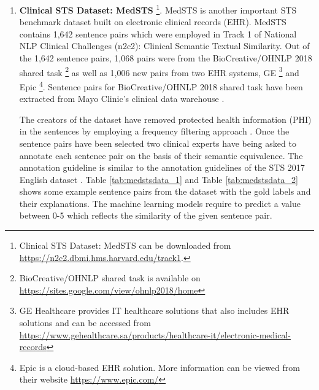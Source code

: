\begin{enumerate}
	 
	\item{ \textbf{Clinical STS Dataset: MedSTS} \footnote{Clinical STS Dataset: MedSTS can be downloaded from \url{https://n2c2.dbmi.hms.harvard.edu/track1}. }}. MedSTS is another important STS benchmark dataset built on electronic clinical records (EHR). MedSTS contains 1,642 sentence pairs which were employed in Track 1 of National NLP Clinical Challenges (n2c2): Clinical Semantic Textual Similarity. Out of the 1,642 sentence pairs, 1,068 pairs were from the BioCreative/OHNLP 2018 shared task \cite{10.1145/3233547.3233672} \footnote{BioCreative/OHNLP shared task is available on \url{https://sites.google.com/view/ohnlp2018/home}} as well as 1,006 new pairs from two EHR systems, GE \footnote{GE Healthcare provides IT healthcare solutions that also includes EHR solutions and can be accessed from \url{https://www.gehealthcare.sa/products/healthcare-it/electronic-medical-records}} and Epic \footnote{Epic is a cloud-based EHR solution. More information can be viewed from their website \url{https://www.epic.com/}}. Sentence pairs for BioCreative/OHNLP 2018 shared task have been extracted from Mayo Clinic’s clinical data warehouse \cite{10.1136/amiajnl-2011-000744}. 
	
	The creators of the dataset have removed protected health information (PHI) in the sentences by employing a frequency filtering approach \cite{Wang2020}. Once the sentence pairs have been selected  two clinical experts have being asked to annotate each sentence pair on the basis of their semantic equivalence. The annotation guideline is similar to the annotation guidelines of the STS 2017 English dataset \cite{agirre-etal-2012-semeval}. Table \ref{tab:medstsdata_1} and Table \ref{tab:medstsdata_2} shows some example sentence pairs from the dataset with the gold labels and their explanations. The machine learning models require to predict a value between 0-5 which reflects the similarity of the given sentence pair.
	
	
	

\end{enumerate}
